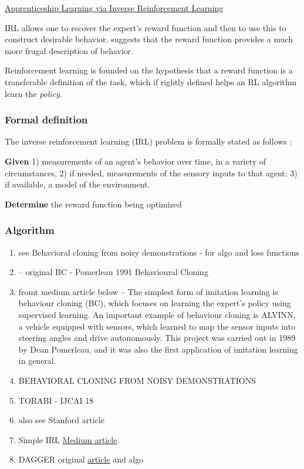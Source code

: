\documentclass{article}
\begin{document}
\href{https://ai.stanford.edu/~ang/papers/icml04-apprentice.pdf}{Apprenticeship Learning via Inverse Reinforcement Learning}

IRL allows one to recover the expert's reward function and then to use this to construct desirable behavior. \citet{ng2000algorithms} suggests that the reward function provides a much more frugal description of behavior. 

Reinforcement learning is founded on the hypothesis that a reward function is a transferable definition of the task, which if rightly defined helps an RL algorithm learn the \textit{policy}. 

\subsubsection{Formal definition}
The inverse reinforcement learning (IRL) problem is formally stated as follows \citep{ng2000algorithms}:

\textbf{Given} 1) measurements of an agent's behavior over time, in a variety of circumstances, 2) if needed, measurements of the sensory inputs to that agent; 3) if available, a model of the environment.

\textbf{Determine} the reward function being optimized

\subsubsection{Algorithm}
\begin{enumerate}
\item see \citep{sasaki2020} Behavioral cloning from noisy demonstrations - for algo and loss functions

\item  \cite{Pomerleau1991} -- original BC - Pomerleau 1991 Behavioural Cloning
\item fromt medium article below -- The simplest form of imitation learning is behaviour cloning (BC), which focuses on learning the expert’s policy using supervised learning. An important example of behaviour cloning is ALVINN, a vehicle equipped with sensors, which learned to map the sensor inputs into steering angles and drive autonomously. This project was carried out in 1989 by Dean Pomerleau, and it was also the first application of imitation learning in general.

\item BEHAVIORAL CLONING FROM NOISY DEMONSTRATIONS

    \item TORABI - IJCAI 18
    \item also see Stanford article
    \item Simple IRL \href{https://smartlabai.medium.com/a-brief-overview-of-imitation-learning-8a8a75c44a9c}{Medium article}.
    \item DAGGER original \href{https://www.ri.cmu.edu/pub_files/2011/4/Ross-AISTATS11-NoRegret.pdf}{article} and algo
\end{enumerate}
\end{document}
